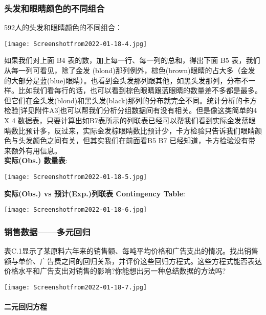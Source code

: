 \hypertarget{ux5934ux53d1ux548cux773cux775bux989cux8272ux7684ux4e0dux540cux7ec4ux5408}{%
\subsubsection{头发和眼睛颜色的不同组合}\label{ux5934ux53d1ux548cux773cux775bux989cux8272ux7684ux4e0dux540cux7ec4ux5408}}

592人的头发和眼睛颜色的不同组合：

\texttt{[image: Screenshotfrom2022-01-18-4.jpg]}



如果我们对上面 B4 表的数，加上每一行、每一列的总和，得出下面 B5
表，我们从每一列可看见，除了金发
(blond)那列例外，棕色(brown)眼睛的占大多（金发的大部分是蓝(blue)眼睛）。也看到金头发那列跟其他，如黑头发那列，分布不一样。比如我们看每行的话，也可以看到棕色眼睛跟蓝眼睛的数量差不多都是最多。但它们在金头发(blond)和黑头发(black)那列的分布就完全不同。统计分析的卡方检验{[}详见附件A3{]}也可以帮我们分析分组数据间有没有相关。但是像这类简单的4
X 4
数据表，只要计算出如B7表所示的列联表已经可以帮我们看到实际金发蓝眼睛数比预计多，反过来，实际金发棕眼睛数比预计少，卡方检验只告诉我们眼睛颜色与头发颜色之间有关，但其实我们在前面看B5
B7 已经知道，卡方检验没有带来额外有用信息。\\
\textbf{实际(Obs.) 数量表}:

\texttt{[image: Screenshotfrom2022-01-18-5.jpg]}

\textbf{实际(Obs.) vs 预计(Exp.)列联表 Contingency Table}:

\texttt{[image: Screenshotfrom2022-01-18-6.jpg]}

\hypertarget{ux9500ux552eux6570ux636eux591aux5143ux56deux5f52}{%
\subsubsection{销售数据------多元回归}\label{ux9500ux552eux6570ux636eux591aux5143ux56deux5f52}}

表C.1显示了某原料六年来的销售额、每吨平均价格和广告支出的情况。找出销售额与单价、广告费之间的回归关系，并评价这些回归方程式。这些方程式能否表达价格水平和广告支出对销售的影响?你能想出另一种总结数据的方法吗?

\texttt{[image: Screenshotfrom2022-01-18-7.jpg]}

\hypertarget{ux4e8cux5143ux56deux5f52ux65b9ux7a0b}{%
\paragraph{二元回归方程}\label{ux4e8cux5143ux56deux5f52ux65b9ux7a0b}}

